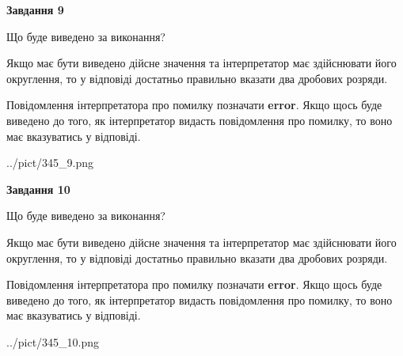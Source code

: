 \documentclass[12pt, ukrainian]{article}
\begin{document}
{\begin {Large}
{\begin {center}\textbf{Завдання 9}\end {center}}\par
Що буде виведено за виконання? \par

Якщо має бути виведено дійсне значення та інтерпретатор має здійснювати його округлення, 
то у відповіді достатньо правильно вказати два дробових розряди.

Повідомлення інтерпретатора про помилку позначати \textbf{error}.
Якщо щось буде виведено до того, як інтерпретатор видасть повідомлення про помилку, 
то воно має вказуватись у відповіді. \par

\begin{center}
	{../pict/345_9.png}
\end{center}
\newpage

{\begin {center}\textbf{Завдання 10}\end {center}}\par
Що буде виведено за виконання? \par

Якщо має бути виведено дійсне значення та інтерпретатор має здійснювати його округлення, 
то у відповіді достатньо правильно вказати два дробових розряди.

Повідомлення інтерпретатора про помилку позначати \textbf{error}.
Якщо щось буде виведено до того, як інтерпретатор видасть повідомлення про помилку, 
то воно має вказуватись у відповіді. \par

\begin{center}
	{../pict/345_10.png}
\end{center}
\newpage

\end {Large}}
\end{document}
